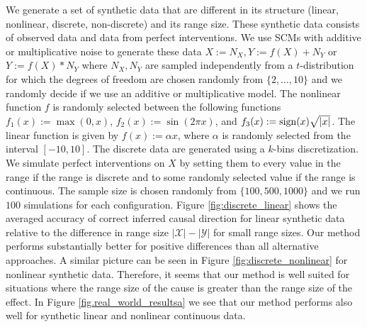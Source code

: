 \documentclass[letterpaper]{article}
\newcommand{\kX}{\mathcal{X}}   %
\newcommand{\kY}{\mathcal{Y}}   %
\begin{document}
We generate a set of synthetic data that are different in its structure (linear, nonlinear, discrete, non-discrete) and its range size. These synthetic data consists of observed data and data from perfect interventions. We use SCMs with additive or multiplicative noise to generate these data $X:= N_X, Y:= f(X) + N_Y$ or $Y:= f(X) *N_Y$ where $N_X, N_Y$ are sampled independently from a $t$-distribution for which the degrees of freedom are chosen randomly from $\{2,\ldots, 10\}$ and we randomly decide if we use an additive or multiplicative model. The nonlinear function $f$ is randomly selected between the following functions $f_1 (x) := \max(0,x)$, $f_2(x):=\sin(2\pi x)$, and $f_3(x):={\rm sign}(x)\sqrt{|x|}$. The linear function is given by $f(x) := \alpha x$, where $\alpha$ is randomly selected from the interval $[-10, 10]$. The discrete data are generated using a $k$-bins discretization. We simulate perfect interventions on $X$ by setting them to every value in the range if the range is discrete and to some randomly selected value if the range is continuous. The sample size is chosen randomly from $\{100,500,1000\}$ and we run $100$ simulations for each configuration. Figure \ref{fig:discrete_linear} shows the averaged accuracy of correct inferred causal direction for linear synthetic data relative to the difference in range size $|\kX| - |\kY|$ for small range sizes. Our method performs substantially better for positive differences than all alternative approaches. A similar picture can be seen in Figure \ref{fig:discrete_nonlinear} for nonlinear synthetic data. Therefore, it seems that our method is well suited for situations where the range size of the cause is greater than the range size of the effect. In Figure \ref{fig.real_world_resultsa} we see that our method performs also well for synthetic linear and nonlinear continuous data.
 
\end{document}
